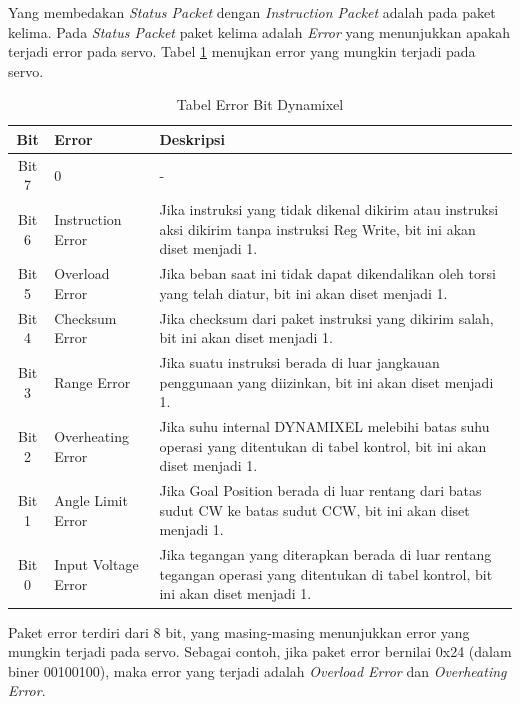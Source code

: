 Yang membedakan \emph{Status Packet} dengan \emph{Instruction Packet} adalah 
pada paket kelima. Pada \emph{Status Packet} paket kelima adalah \emph{Error} 
yang menunjukkan apakah terjadi error pada servo. Tabel \ref{tab:Error} 
menujkan error yang mungkin terjadi pada servo. 

\begin{table}[H]
\centering
\caption{Tabel Error Bit Dynamixel}
\label{tab:Error}
\begin{tabular}{|c|l|p{9cm}|}
\hline
\textbf{Bit} & \textbf{Error} & \textbf{Deskripsi} \\
\hline
Bit 7 & 0 & - \\
\hline
Bit 6 & Instruction Error & Jika instruksi yang tidak dikenal dikirim atau instruksi aksi dikirim tanpa instruksi Reg Write, bit ini akan diset menjadi 1. \\
\hline
Bit 5 & Overload Error & Jika beban saat ini tidak dapat dikendalikan oleh torsi yang telah diatur, bit ini akan diset menjadi 1. \\
\hline
Bit 4 & Checksum Error & Jika checksum dari paket instruksi yang dikirim salah, bit ini akan diset menjadi 1. \\
\hline
Bit 3 & Range Error & Jika suatu instruksi berada di luar jangkauan penggunaan yang diizinkan, bit ini akan diset menjadi 1. \\
\hline
Bit 2 & Overheating Error & Jika suhu internal DYNAMIXEL melebihi batas suhu operasi yang ditentukan di tabel kontrol, bit ini akan diset menjadi 1. \\
\hline
Bit 1 & Angle Limit Error & Jika Goal Position berada di luar rentang dari batas sudut CW ke batas sudut CCW, bit ini akan diset menjadi 1. \\
\hline
Bit 0 & Input Voltage Error & Jika tegangan yang diterapkan berada di luar rentang tegangan operasi yang ditentukan di tabel kontrol, bit ini akan diset menjadi 1. \\
\hline
\end{tabular}
\end{table}

Paket error terdiri dari 8 bit, yang masing-masing menunjukkan error yang
mungkin terjadi pada servo. Sebagai contoh, jika paket error bernilai 0x24 (dalam biner 00100100), maka
error yang terjadi adalah \emph{Overload Error} dan \emph{Overheating Error}.